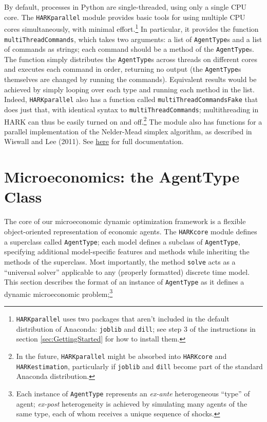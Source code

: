 \documentclass[12pt,titlepage,letterpaper]{econtex}
\begin{document}
By default, processes in Python are single-threaded, using only a single CPU core.  The \texttt{HARKparallel} module provides basic tools for using multiple CPU cores simultaneously, with minimal effort.\footnote{\texttt{HARKparallel} uses two packages that aren't included in the default distribution of Anaconda: \texttt{joblib} and \texttt{dill}; see step 3 of the instructions in section \ref{sec:GettingStarted} for how to install them.}  In particular, it provides the function \texttt{multiThreadCommands}, which takes two arguments: a list of \texttt{AgentType}s and a list of commands as strings; each command should be a method of the \texttt{AgentType}s.  The function simply distributes the \texttt{AgentType}s across threads on different cores and executes each command in order, returning no output (the \texttt{AgentType}s themselves are changed by running the commands).  Equivalent results would be achieved by simply looping over each type and running each method in the list.  Indeed, \texttt{HARKparallel} also has a function called \texttt{multiThreadCommandsFake} that does just that, with identical syntax to \texttt{multiThreadCommands}; multithreading in HARK can thus be easily turned on and off.\footnote{In the future, \texttt{HARKparallel} might be absorbed into \texttt{HARKcore} and \texttt{HARKestimation}, particularly if \texttt{joblib} and \texttt{dill} become part of the standard Anaconda distribution.}  The module also has functions for a parallel implementation of the Nelder-Mead simplex algorithm, as described in Wiswall and Lee (2011). See \href{https://econ-ark.github.io/HARK/generated/HARKparallel.html}{here} for full documentation.

\section{Microeconomics: the AgentType Class}\label{sec:Microeconomics}

The core of our microeconomic dynamic optimization framework is a flexible object-oriented representation of economic agents.  The \texttt{HARKcore} module defines a superclass called \texttt{AgentType}; each model defines a subclass of \texttt{AgentType}, specifying additional model-specific features and methods while inheriting the methods of the superclass.  Most importantly, the method \texttt{solve} acts as a ``universal solver'' applicable to any (properly formatted) discrete time model.  This section describes the format of an instance of \texttt{AgentType} as it defines a dynamic microeconomic problem;\footnote{Each instance of \texttt{AgentType} represents an \textit{ex-ante} heterogeneous ``type'' of agent; \textit{ex-post} heterogeneity is achieved by simulating many agents of the same type, each of whom receives a unique sequence of shocks.}
\end{document}
